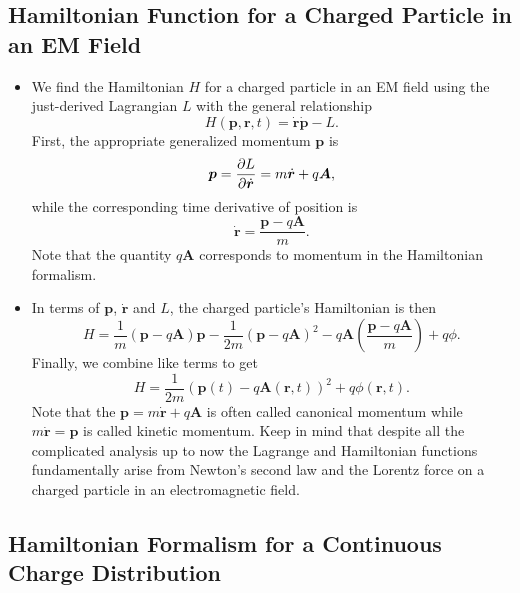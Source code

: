 \documentclass[11pt, a4paper]{article}
\renewcommand{\vec}[1]{\bm{#1}} %
\renewcommand{\r}{\vec{r}}
\newcommand{\A}{\vec{A}} %
\begin{document}
\subsection{Hamiltonian Function for a Charged Particle in an EM Field}
\begin{itemize}
    \item We find the Hamiltonian $ H $ for a charged particle in an EM field using the just-derived Lagrangian $ L $ with the general relationship
    \begin{equation*}
        H( \vec{p}, \vec{r}, t) = \dot{\vec{r}} \dot{\vec{p}} - L.
    \end{equation*}
    First, the appropriate generalized momentum $ \vec{p} $ is
    \begin{equation*}
        \vec{p} = \pdv{L}{ \dot{\vec{r}}} = m \dot{\vec{r}} + q \A,
    \end{equation*}
    while the corresponding time derivative of position is
    \begin{equation*}
        \dot{\vec{r}} = \frac{\vec{p} - q\A}{m}.
    \end{equation*}
    Note that the quantity $ q \A $ corresponds to momentum in the Hamiltonian formalism. 

    \item In terms of $ \vec{p} $, $ \dot{\vec{r}} $ and $ L $, the charged particle's Hamiltonian is then
    \begin{equation*}
        H = \frac{1}{m} ( \vec{p} - q\A) \vec{p} - \frac{1}{2m} ( \vec{p} - q\A)^{2} - q\A \left( \frac{ \vec{p} - q \A}{m} \right) + q \phi.
    \end{equation*}
    Finally, we combine like terms to get
    \begin{equation*}
        H = \frac{1}{2m}( \vec{p}(t) - q\A (\r, t))^{2} + q \phi(\r, t).
    \end{equation*}
    Note that the $ \vec{p} = m \dot{\vec{r}} + q \A $ is often called canonical momentum while $ m \dot{\vec{r}} = \vec{p} $ is called kinetic momentum. Keep in mind that despite all the complicated analysis up to now the Lagrange and Hamiltonian functions fundamentally arise from Newton's second law and the Lorentz force on a charged particle in an electromagnetic field.
    
\end{itemize}


\subsection{Hamiltonian Formalism for a Continuous Charge Distribution}
\end{document}
